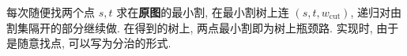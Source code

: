 每次随便找两个点 $s, t$ 求在\textbf{原图}的最小割, 在最小割树上连 $(s, t, w_\mathrm{cut})$,
递归对由割集隔开的部分继续做. 在得到的树上, 两点最小割即为树上瓶颈路.
实现时, 由于是随意找点, 可以写为分治的形式.
